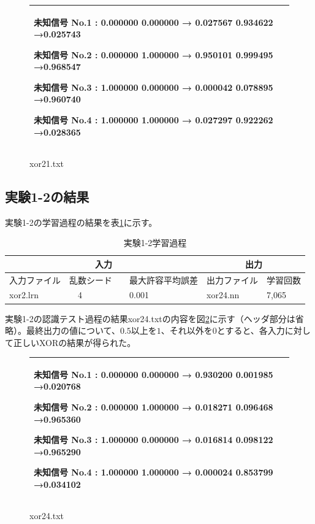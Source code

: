 \documentclass[final]{jarticle}[2012/05/15]
\begin{document}
\begin{figure}[h]
  \begin{center}
    \begin{tabular}{|p{12cm}|}\hline
      未知信号 No.1 : 0.000000 0.000000  → 0.027567 0.934622 →0.025743　\par
      未知信号 No.2 : 0.000000 1.000000  → 0.950101 0.999495 →0.968547　\par
      未知信号 No.3 : 1.000000 0.000000  → 0.000042 0.078895 →0.960740　\par
      未知信号 No.4 : 1.000000 1.000000  → 0.027297 0.922262 →0.028365　\\ \hline
    \end{tabular}
    \caption{xor21.txt} \label{zi_ke_11}
  \end{center}
\end{figure}
\pagebreak
\subsection{実験1-2の結果}
実験1-2の学習過程の結果を表\ref{zi_ga_12}に示す。\par
\begin{table}[h]
  \begin{center}
    \caption{実験1-2学習過程} \label{zi_ga_12}
    \begin{tabular}{|l|l|l|l|l|}\hline
      \multicolumn{3}{|c|}{入力} & \multicolumn{2}{|c|}{出力} \\ \hline
      入力ファイル & 乱数シード &　最大許容平均誤差 & 出力ファイル & 学習回数 \\ \hline
      xor2.lrn &　4 &　0.001 & xor24.nn & 7,065 \\ \hline
    \end{tabular}
  \end{center}
\end{table}
実験1-2の認識テスト過程の結果xor24.txtの内容を図\ref{zi_ke_12}に示す（ヘッダ部分は省略）。最終出力の値について、$0.5$以上を$1$、それ以外を$0$とすると、各入力に対して正しいXORの結果が得られた。\par\par
  \begin{figure}[h]
    \begin{center}
      \begin{tabular}{|p{12cm}|}\hline
        未知信号 No.1 : 0.000000 0.000000  → 0.930200 0.001985 →0.020768　\par
        未知信号 No.2 : 0.000000 1.000000  → 0.018271 0.096468 →0.965360　\par
        未知信号 No.3 : 1.000000 0.000000  → 0.016814 0.098122 →0.965290　\par
        未知信号 No.4 : 1.000000 1.000000  → 0.000024 0.853799 →0.034102　\\ \hline
      \end{tabular}
      \caption{xor24.txt} \label{zi_ke_12}
    \end{center}
  \end{figure}
\pagebreak
\end{document}
